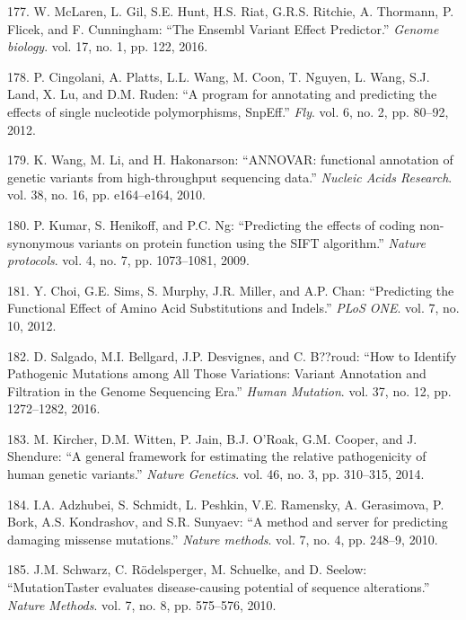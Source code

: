 \documentclass[12pt,a4paper,twoside]{ugathesis}
\theoremstyle{definition}
\theoremstyle{definition}
\theoremstyle{definition}
\theoremstyle{remark}
\begin{document}
\hypertarget{ref-McLaren2016}{}
177. W. McLaren, L. Gil, S.E. Hunt, H.S. Riat, G.R.S. Ritchie, A.
Thormann, P. Flicek, and F. Cunningham: ``The Ensembl Variant Effect
Predictor.'' \emph{Genome biology}. vol. 17, no. 1, pp. 122, 2016.

\hypertarget{ref-Cingolani2012}{}
178. P. Cingolani, A. Platts, L.L. Wang, M. Coon, T. Nguyen, L. Wang,
S.J. Land, X. Lu, and D.M. Ruden: ``A program for annotating and
predicting the effects of single nucleotide polymorphisms, SnpEff.''
\emph{Fly}. vol. 6, no. 2, pp. 80--92, 2012.

\hypertarget{ref-Wang2010}{}
179. K. Wang, M. Li, and H. Hakonarson: ``ANNOVAR: functional annotation
of genetic variants from high-throughput sequencing data.''
\emph{Nucleic Acids Research}. vol. 38, no. 16, pp. e164--e164, 2010.

\hypertarget{ref-Kumar2009}{}
180. P. Kumar, S. Henikoff, and P.C. Ng: ``Predicting the effects of
coding non-synonymous variants on protein function using the SIFT
algorithm.'' \emph{Nature protocols}. vol. 4, no. 7, pp. 1073--1081,
2009.

\hypertarget{ref-Choi2012}{}
181. Y. Choi, G.E. Sims, S. Murphy, J.R. Miller, and A.P. Chan:
``Predicting the Functional Effect of Amino Acid Substitutions and
Indels.'' \emph{PLoS ONE}. vol. 7, no. 10, 2012.

\hypertarget{ref-Salgado2016}{}
182. D. Salgado, M.I. Bellgard, J.P. Desvignes, and C. B??roud: ``How to
Identify Pathogenic Mutations among All Those Variations: Variant
Annotation and Filtration in the Genome Sequencing Era.'' \emph{Human
Mutation}. vol. 37, no. 12, pp. 1272--1282, 2016.

\hypertarget{ref-Kircher2014}{}
183. M. Kircher, D.M. Witten, P. Jain, B.J. O'Roak, G.M. Cooper, and J.
Shendure: ``A general framework for estimating the relative
pathogenicity of human genetic variants.'' \emph{Nature Genetics}. vol.
46, no. 3, pp. 310--315, 2014.

\hypertarget{ref-Adzhubei2010}{}
184. I.A. Adzhubei, S. Schmidt, L. Peshkin, V.E. Ramensky, A.
Gerasimova, P. Bork, A.S. Kondrashov, and S.R. Sunyaev: ``A method and
server for predicting damaging missense mutations.'' \emph{Nature
methods}. vol. 7, no. 4, pp. 248--9, 2010.

\hypertarget{ref-Schwarz2010}{}
185. J.M. Schwarz, C. Rödelsperger, M. Schuelke, and D. Seelow:
``MutationTaster evaluates disease-causing potential of sequence
alterations.'' \emph{Nature Methods}. vol. 7, no. 8, pp. 575--576, 2010.
\end{document}
